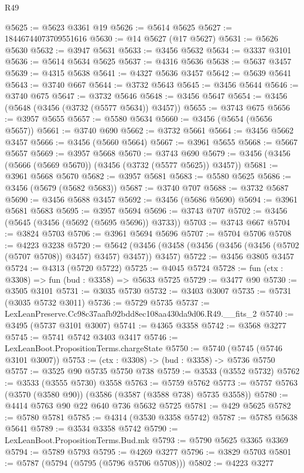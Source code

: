 \begin{lexlean}{R49}
\begin{coremodule}
@5625 := @5623 @3361 @19
@5626 := @5614 @5625
@5627 := 18446744073709551616
@5630 := @14 @5627 (@17 @5627)
@5631 := @5626 @5630
@5632 := @3947 @5631
@5633 := @3456 @5632
@5634 := @3337 @3101
@5636 := @5614 @5634 @5625
@5637 := @4316 @5636
@5638 := @5637 @3457
@5639 := @4315 @5638
@5641 := @4327 @5636 @3457
@5642 := @5639 @5641
@5643 := @3740 @667
@5644 := @3732 @5643
@5645 := @3456 @5644
@5646 := @3740 @675
@5647 := @3732 @5646
@5648 := @3456 @5647
@5654 := @3456 (@5648 (@3456 (@3732 (@5577 @5634)) @3457))
@5655 := @3743 @675
@5656 := @3957 @5655
@5657 := @5580 @5634
@5660 := @3456 (@5654 (@5656 @5657))
@5661 := @3740 @690
@5662 := @3732 @5661
@5664 := @3456 @5662 @3457
@5666 := @3456 (@5660 @5664)
@5667 := @3961 @5655
@5668 := @5667 @5657
@5669 := @3957 @5668
@5670 := @3743 @690
@5679 := @3456 (@3456 (@5666 (@5669 @5670)) (@3456 (@3732 (@5577 @5625)) @3457))
@5681 := @3961 @5668 @5670
@5682 := @3957 @5681
@5683 := @5580 @5625
@5686 := @3456 (@5679 (@5682 @5683))
@5687 := @3740 @707
@5688 := @3732 @5687
@5690 := @3456 @5688 @3457
@5692 := @3456 (@5686 @5690)
@5694 := @3961 @5681 @5683
@5695 := @3957 @5694
@5696 := @3743 @707
@5702 := @3456 (@5645 (@3456 (@5692 (@5695 @5696)) @3733))
@5703 := @3743 @667
@5704 := @3824 @5703
@5706 := @3961 @5694 @5696
@5707 := @5704 @5706
@5708 := @4223 @3238
@5720 := @5642 (@3456 (@3458 (@3456 (@3456 (@3456 (@5702 (@5707 @5708)) @3457) @3457) @3457)) @3457)
@5722 := @3456 @3805 @3457
@5724 := @4313 (@5720 @5722)
@5725 := @4045 @5724
@5728 := fun (ctx : @3308) => fun (bud : @3358) => @5633 @5725
@5729 := @3477 @90
@5730 := @3505 @3101
@5731 := @3035 @5730
@5732 := @3403 @3007
@5735 := @5731 (@3035 @5732 @3011)
@5736 := @5729 @5735
@5737 := LexLeanPreserve.Cc98c37aafb92bdd8ec108aa430da9d06.R49.__fits_2
@5740 := @3495 (@5737 @3101 @3007)
@5741 := @4365 @3358
@5742 := @3568 @3277
@5745 := @5741 @5742 @3403 @3417
@5746 := LexLeanBoot.PropositionTerms.chargeState
@5750 := @5740 (@5745 (@5746 @3101 @3007))
@5753 := (ctx : @3308) -> (bud : @3358) -> @5736 @5750
@5757 := @3525 @90 @5735 @5750 @738
@5759 := @3533 (@3552 @5732)
@5762 := @3533 (@3555 @5730) @3558
@5763 := @5759 @5762
@5773 := @5757 @5763 (@3570 (@3580 @90)) (@3586 (@3587 (@3588 @738) @5735 @3558))
@5780 := @4414 @5763 @90 @22 @640 @736 @5632 @5725
@5781 := @429 @5625
@5782 := @5780 @5781
@5785 := @4314 (@3530 @3358 @5742)
@5787 := @5785 @5638 @5641
@5789 := @3534 @3358 @5742
@5790 := LexLeanBoot.PropositionTerms.Bud.mk
@5793 := @5790 @5625 @3365 @3369
@5794 := @5789 @5793
@5795 := @4269 @3277
@5796 := @3829 @5703
@5801 := @5787 (@5794 (@5795 (@5796 @5706 @5708)))
@5802 := @4223 @3277

\end{coremodule}
\end{lexlean}

